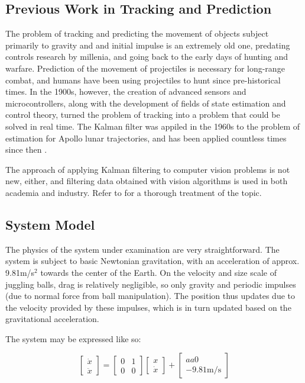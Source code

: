 \documentclass[letterpaper, 10 pt, conference]{ieeeconf}  %
\begin{document}
\subsection{Previous Work in Tracking and Prediction}

The problem of tracking and predicting the movement of objects subject primarily to gravity and and initial impulse is an extremely old one, predating controls research by millenia, and going back to the early days of hunting and warfare. Prediction of the movement of projectiles is necessary for long-range combat, and humans have been using projectiles to hunt since pre-historical times. In the 1900s, however, the creation of advanced sensors and microcontrollers, along with the development of fields of state estimation and control theory, turned the problem of tracking into a problem that could be solved in real time. The Kalman filter was appiled in the 1960s to the problem of estimation for Apollo lunar trajectories, and has been applied countless times since then \cite{kalmanapollo}.

The approach of applying Kalman filtering to computer vision problems is not new, either, and filtering data obtained with vision algorithms is used in both academia and industry. Refer to \cite{funk} for a thorough treatment of the topic.

\subsection{System Model}

The physics of the system under examination are very straightforward. The system is subject to basic Newtonian gravitation, with an acceleration of approx. 9.81m/s$^{2}$ towards the center of the Earth. On the velocity and size scale of juggling balls, drag is relatively negligible, so only gravity and periodic impulses (due to normal force from ball manipulation). The position thus updates due to the velocity provided by these impulses, which is in turn updated based on the gravitational acceleration.

The system may be expressed like so: 

\[
\left[
\begin{array}{c}
\dot{x} \\
\ddot{x}
\end{array}
\right]=\left[
\begin{array}{cc}
 0 & 1 \\
 0 & 0
\end{array}
\right]\left[
\begin{array}{c}
 x \\
\dot{x}
\end{array}
\right]+\left[
\begin{array}{c}
aa 0 \\
-9.81 \text{m/s}
\end{array}
\right]
\]
\end{document}
